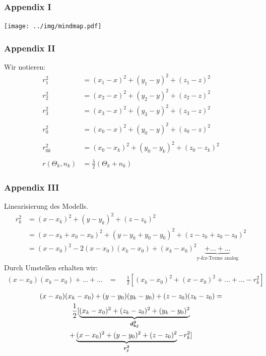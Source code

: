 
\begin{frame}[noframenumbering]
  \frametitle{Appendix I} 
	\centering
	\texttt{[image: ../img/mindmap.pdf]}
\end{frame}
\begin{frame}[noframenumbering]
  	\frametitle{Appendix II}
%  
	Wir notieren:
%	
	\begin{align}
		r_1^2&= (x_1-x )^2 + (y_1-y )^2 + (z_1-z )^2\\
		r_2^2&= (x_2-x )^2 + (y_2-y )^2 + (z_2-z )^2\\
		r_3^2&= (x_3-x )^2 + (y_3-y )^2 + (z_3-z )^2\\
		\nonumber\\
		r_0^2&= (x_0-x )^2 + (y_0-y )^2 + (z_0-z )^2\\
		\nonumber\\
		r_{0k}^2&= (x_0-x_k )^2 + (y_0-y_k )^2 + (z_0-z_k )^2 \\
		\nonumber\\
		r(\Theta_k,n_k)&=\frac{\lambda}{2}\left(\Theta_k+n_k\right)
%		
	\end{align}
%
\end{frame}
\begin{frame}[noframenumbering]
  	\frametitle{Appendix III}
%
Linearisierung des Modells.
%
\begin{align}
	r_{k}^2 &= (x-x_k)^2+(y-y_k)^2+(z-z_k)^2 \nonumber \\
	&=(x-x_k+x_0-x_0)^2+(y-y_k+y_0-y_0)^2+(z-z_k+z_0-z_0)^2 \nonumber \\
	&=(x-x_0)^2-2(x-x_0)(x_k-x_0)+(x_k-x_0)^2\underbrace{+\dots{}+\dots{}}_\text{y-\& z-Terme analog}
	\label{eq:tri_temp1}
%
\end{align}
%
Durch Umstellen erhalten wir:
\begin{align}
(x-x_0)(x_k-x_0)+\dots{}+\dots{}&=\phantom{-}\frac{1}{2}[(x_k-x_0)^2 +(x-x_0)^2 +\dots{}+\dots{}-r_k^2]\nonumber
%
\end{align}
%
\begin{multline}
	(x-x_0)(x_k-x_0)+(y-y_0)(y_k-y_0)+(z-z_0)(z_k-z_0)= \\\frac{1}{2}[\underbrace{(x_k-x_0)^2+(z_k-z_0)^2+(y_k-y_0)^2}_\text{\boldmath{$d_{kj}^2$}}
	\\+\underbrace{(x-x_0)^2+(y-y_0)^2 +(z-z_0)^2}_\text{\boldmath{$r_j^2$}}-r_k^2]
\end{multline}
	
%
\end{frame}
